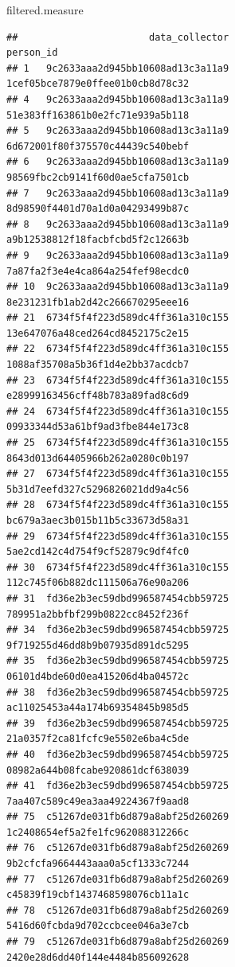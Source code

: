 \documentclass[]{article}
\newenvironment{Shaded}{\begin{snugshade}}{\end{snugshade}}
\newcommand{\NormalTok}[1]{#1}
\begin{document}
\begin{Shaded}
\begin{Highlighting}[]
\NormalTok{filtered.measure}
\end{Highlighting}
\end{Shaded}

\begin{verbatim}
##                       data_collector                          person_id
## 1   9c2633aaa2d945bb10608ad13c3a11a9   1cef05bce7879e0ffee01b0cb8d78c32
## 4   9c2633aaa2d945bb10608ad13c3a11a9   51e383ff163861b0e2fc71e939a5b118
## 5   9c2633aaa2d945bb10608ad13c3a11a9   6d672001f80f375570c44439c540bebf
## 6   9c2633aaa2d945bb10608ad13c3a11a9   98569fbc2cb9141f60d0ae5cfa7501cb
## 7   9c2633aaa2d945bb10608ad13c3a11a9   8d98590f4401d70a1d0a04293499b87c
## 8   9c2633aaa2d945bb10608ad13c3a11a9   a9b12538812f18facbfcbd5f2c12663b
## 9   9c2633aaa2d945bb10608ad13c3a11a9   7a87fa2f3e4e4ca864a254fef98ecdc0
## 10  9c2633aaa2d945bb10608ad13c3a11a9   8e231231fb1ab2d42c266670295eee16
## 21  6734f5f4f223d589dc4ff361a310c155   13e647076a48ced264cd8452175c2e15
## 22  6734f5f4f223d589dc4ff361a310c155   1088af35708a5b36f1d4e2bb37acdcb7
## 23  6734f5f4f223d589dc4ff361a310c155   e28999163456cff48b783a89fad8c6d9
## 24  6734f5f4f223d589dc4ff361a310c155   09933344d53a61bf9ad3fbe844e173c8
## 25  6734f5f4f223d589dc4ff361a310c155   8643d013d64405966b262a0280c0b197
## 27  6734f5f4f223d589dc4ff361a310c155   5b31d7eefd327c5296826021dd9a4c56
## 28  6734f5f4f223d589dc4ff361a310c155   bc679a3aec3b015b11b5c33673d58a31
## 29  6734f5f4f223d589dc4ff361a310c155   5ae2cd142c4d754f9cf52879c9df4fc0
## 30  6734f5f4f223d589dc4ff361a310c155   112c745f06b882dc111506a76e90a206
## 31  fd36e2b3ec59dbd996587454cbb59725   789951a2bbfbf299b0822cc8452f236f
## 34  fd36e2b3ec59dbd996587454cbb59725   9f719255d46dd8b9b07935d891dc5295
## 35  fd36e2b3ec59dbd996587454cbb59725   06101d4bde60d0ea415206d4ba04572c
## 38  fd36e2b3ec59dbd996587454cbb59725   ac11025453a44a174b69354845b985d5
## 39  fd36e2b3ec59dbd996587454cbb59725   21a0357f2ca81fcfc9e5502e6ba4c5de
## 40  fd36e2b3ec59dbd996587454cbb59725   08982a644b08fcabe920861dcf638039
## 41  fd36e2b3ec59dbd996587454cbb59725   7aa407c589c49ea3aa49224367f9aad8
## 75  c51267de031fb6d879a8abf25d260269   1c2408654ef5a2fe1fc962088312266c
## 76  c51267de031fb6d879a8abf25d260269   9b2cfcfa9664443aaa0a5cf1333c7244
## 77  c51267de031fb6d879a8abf25d260269   c45839f19cbf1437468598076cb11a1c
## 78  c51267de031fb6d879a8abf25d260269   5416d60fcbda9d702ccbcee046a3e7cb
## 79  c51267de031fb6d879a8abf25d260269   2420e28d6dd40f144e4484b856092628

\end{verbatim}
\end{document}
